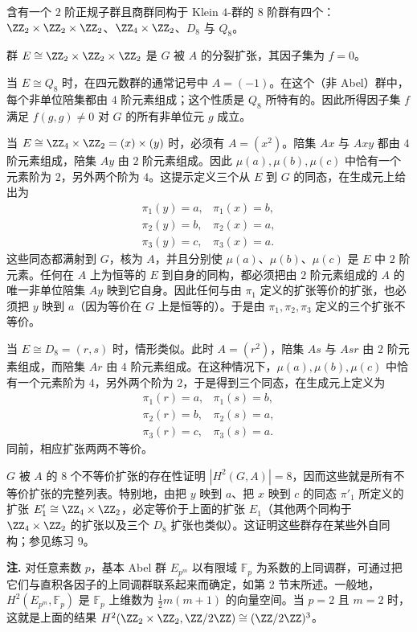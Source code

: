 含有一个 $2$ 阶正规子群且商群同构于 Klein $4$-群的 $8$ 阶群有四个：$\ZZ_2\times\ZZ_2\times\ZZ_2$、$\ZZ_4\times\ZZ_2$、$D_8$ 与 $Q_8$。

群 $E\cong\ZZ_2\times\ZZ_2\times\ZZ_2$ 是 $G$ 被 $A$ 的分裂扩张，其因子集为 $f=0$。

当 $E\cong Q_8$ 时，在四元数群的通常记号中 $A=(-1)$。在这个（非 Abel）群中，每个非单位陪集都由 $4$ 阶元素组成；这个性质是 $Q_8$ 所特有的。因此所得因子集 $f$ 满足 $f(g,g)\neq0$ 对 $G$ 的所有非单位元 $g$ 成立。

当 $E\cong\ZZ_4\times\ZZ_2=(x)\times(y)$ 时，必须有 $A=(x^2)$。陪集 $Ax$ 与 $Axy$ 都由 $4$ 阶元素组成，陪集 $Ay$ 由 $2$ 阶元素组成。因此 $\mu(a),\mu(b),\mu(c)$ 中恰有一个元素阶为 $2$，另外两个阶为 $4$。这提示定义三个从 $E$ 到 $G$ 的同态，在生成元上给出为
\[
\begin{array}{ll}
  \pi_1(y)=a, & \pi_1(x)=b,\\
  \pi_2(y)=b, & \pi_2(x)=a,\\
  \pi_3(y)=c, & \pi_3(x)=a.
\end{array}
\]
这些同态都满射到 $G$，核为 $A$，并且分别使 $\mu(a)$、$\mu(b)$、$\mu(c)$ 是 $E$ 中 $2$ 阶元素。任何在 $A$ 上为恒等的 $E$ 到自身的同构，都必须把由 $2$ 阶元素组成的 $A$ 的唯一非单位陪集 $Ay$ 映到它自身。因此任何与由 $\pi_1$ 定义的扩张等价的扩张，也必须把 $y$ 映到 $a$（因为等价在 $G$ 上是恒等的）。于是由 $\pi_1,\pi_2,\pi_3$ 定义的三个扩张不等价。

当 $E\cong D_8=(r,s)$ 时，情形类似。此时 $A=(r^2)$，陪集 $As$ 与 $Asr$ 由 $2$ 阶元素组成，而陪集 $Ar$ 由 $4$ 阶元素组成。在这种情况下，$\mu(a),\mu(b),\mu(c)$ 中恰有一个元素阶为 $4$，另外两个阶为 $2$，于是得到三个同态，在生成元上定义为
\[
\begin{array}{ll}
  \pi_1(r)=a, & \pi_1(s)=b,\\
  \pi_2(r)=b, & \pi_2(s)=a,\\
  \pi_3(r)=c, & \pi_3(s)=a.
\end{array}
\]
同前，相应扩张两两不等价。

$G$ 被 $A$ 的 $8$ 个不等价扩张的存在性证明 $|H^2(G,A)|=8$，因而这些就是所有不等价扩张的完整列表。特别地，由把 $y$ 映到 $a$、把 $x$ 映到 $c$ 的同态 $\pi'_1$ 所定义的扩张 $E'_1\cong\ZZ_4\times\ZZ_2$，必定等价于上面的扩张 $E_1$（其他两个同构于 $\ZZ_4\times\ZZ_2$ 的扩张以及三个 $D_8$ 扩张也类似）。这证明这些群存在某些外自同构；参见练习 9。

\noindent\textbf{注.} 对任意素数 $p$，基本 Abel 群 $E_{p^m}$ 以有限域 $\mathbb F_p$ 为系数的上同调群，可通过把它们与直积各因子的上同调群联系起来而确定，如第 2 节末所述。一般地，$H^2(E_{p^m},\mathbb F_p)$ 是 $\mathbb F_p$ 上维数为 $\frac12m(m+1)$ 的向量空间。当 $p=2$ 且 $m=2$ 时，这就是上面的结果 $H^2(\ZZ_2\times\ZZ_2,\ZZ/2\ZZ)\cong(\ZZ/2\ZZ)^3$。

